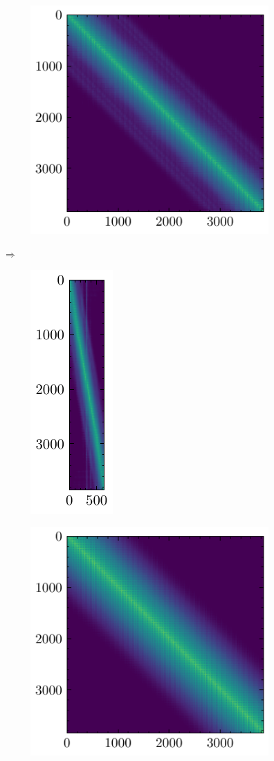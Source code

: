 \begin{figure}[h]
\centering
\begin{subfigure}{0.5\linewidth}
\centering
\includegraphics[scale=1.0]{Pics/densityO}
\end{subfigure}
$\Longrightarrow$
\begin{subfigure}{0.4\linewidth}
\centering
\includegraphics[scale=1.0]{Pics/choleskyO}
\end{subfigure}%
\hfill
\centering
\begin{subfigure}{0.5\linewidth}
\centering
\includegraphics[scale=1.0]{Pics/densityV}

\end{subfigure}
\end{figure}
